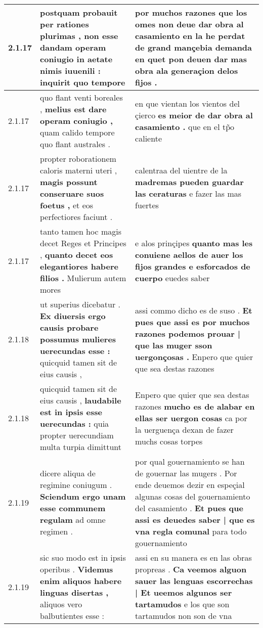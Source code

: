 \begin{tabular}{|p{1cm}|p{6.5cm}|p{6.5cm}|}
2.1.17 & postquam probauit per rationes plurimas , \textbf{ non esse dandam operam coniugio in aetate nimis iuuenili : } inquirit quo tempore & por muchos razones \textbf{ que los omes non deue dar obra al casamiento } en la he perdat de grand mançebia demanda en quet pon deuen dar mas obra ala generaçion delos fijos . \\\hline
2.1.17 & quo flant venti boreales , \textbf{ melius est dare operam coniugio , } quam calido tempore quo flant australes . & en que vientan los vientos del çierco \textbf{ es meior de dar obra al casamiento . } que en el tp̃o caliente \\\hline
2.1.17 & propter roborationem caloris materni uteri , \textbf{ magis possunt conseruare suos foetus , } et eos perfectiores faciunt . & calentraa del uientre de la \textbf{ madremas pueden guardar las ceraturas } e fazer las mas fuertes \\\hline
2.1.17 & tanto tamen hoc magis decet Reges et Principes , \textbf{ quanto decet eos elegantiores habere filios . } Mulierum autem mores & e alos prinçipes \textbf{ quanto mas les conuiene aellos de auer los fijos grandes e esforcados de cuerpo } euedes saber \\\hline
2.1.18 & ut superius dicebatur . \textbf{ Ex diuersis ergo causis probare possumus mulieres uerecundas esse : } quicquid tamen sit de eius causis , & assi commo dicho es de suso . \textbf{ Et pues que assi es por muchos razones podemos prouar | que las muger sson uergonçosas . } Enpero que quier que sea destas razones \\\hline
2.1.18 & quicquid tamen sit de eius causis , \textbf{ laudabile est in ipsis esse uerecundas : } quia propter uerecundiam multa turpia dimittunt & Enpero que quier que sea destas razones \textbf{ mucho es de alabar en ellas ser uergon cosas } ca por la uerguença dexan de fazer muchs cosas torpes \\\hline
2.1.19 & dicere aliqua de regimine coniugum . \textbf{ Sciendum ergo unam esse communem regulam } ad omne regimen . & por qual gouernamiento se han de gouernar las mugers . Por ende deuemos dezir en espeçial algunas cosas del gouernamiento del casamiento . \textbf{ Et pues que assi es deuedes saber | que es vna regla comunal } para todo gouernamiento \\\hline
2.1.19 & sic suo modo est in ipsis operibus . \textbf{ Videmus enim aliquos habere linguas disertas , } aliquos vero balbutientes esse : & assi en su manera es en las obras propreas . \textbf{ Ca veemos alguon sauer las lenguas escorrechas | Et ueemos algunos ser tartamudos } e los que son tartamudos non son de vna \\\hline

\end{tabular}
